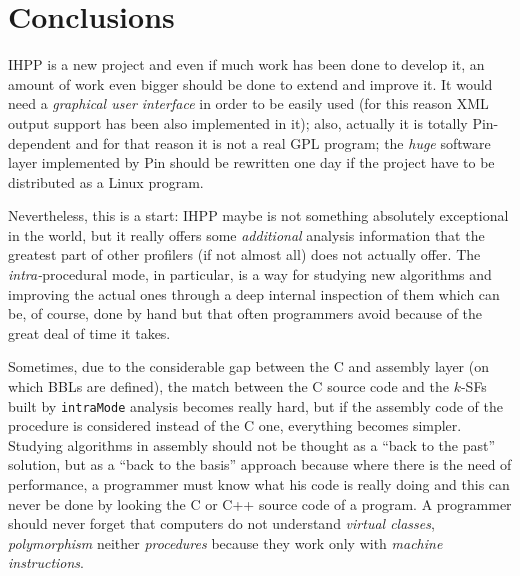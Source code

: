 \documentclass[a4paper,10pt]{report}
\begin{document}
\chapter{Conclusions}

IHPP is a new project and even if much work has been done to develop it, 
an amount of work even bigger should be done to extend and improve it.
It would need a \emph{graphical user interface} in order to be easily used
(for this reason XML output support has been also implemented in it);
also, actually it is totally Pin-dependent and for that reason it is not
a real GPL program; the \emph{huge} software layer implemented by Pin should 
be rewritten one day if the project have to be distributed as a Linux program.

Nevertheless, this is a start: IHPP maybe is not something absolutely exceptional
in the world, but it really offers some \emph{additional} analysis information that
the greatest part of other profilers (if not almost all) does not actually offer. 
The \emph{intra-}procedural mode, in particular, is a way for studying new algorithms 
and improving the actual ones through a deep internal inspection of them 
which can be, of course, done by hand but that often programmers avoid because of the 
great deal of time it takes.

Sometimes, due to the considerable gap between the C
and assembly layer (on which BBLs are defined), 
the match between the C source code and the $k$-SFs built by \verb|intraMode| analysis
becomes really hard, but if the assembly code of the procedure is considered instead of
the C one, everything becomes simpler. 
Studying algorithms in assembly should not be
thought as a ``back to the past'' solution, but as a ``back to the basis'' approach
because where there is the need of performance, a programmer must know what 
his code is really doing and this can never be done 
by looking the C or C++ source code of a program. 
A programmer should never forget that computers do not understand
 \emph{virtual classes}, \emph{polymorphism} neither \emph{procedures} because 
they work only with \emph{machine instructions}.


{}

\end{document}
